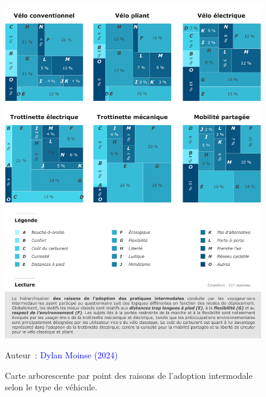 \begin{refsegment}
    \begin{figure}[h!]\vspace*{4pt}
        \caption{Carte arborescente par point des raisons de l'adoption intermodale selon le type de véhicule.}
        \label{fig-chap4:raisons-adoption-modale-points-modes}
        \centerline{\includegraphics[width=1\columnwidth]{src/Figures/Chap-4/FR_Treemap_raisons_adoption.pdf}}
        \vspace{5pt}
        \begin{flushright}\scriptsize{
        Auteur~: \textcolor{blue}{Dylan Moinse (2024)}
        }\end{flushright}
    \end{figure}


\end{refsegment}
